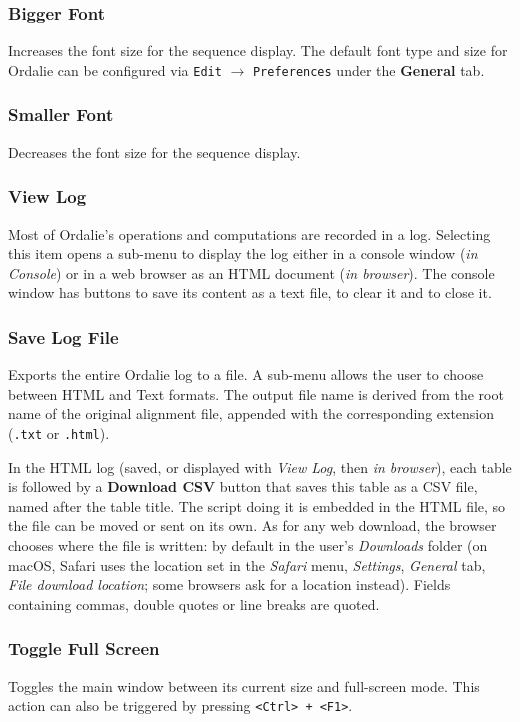 \documentclass[a4paper]{article}
\begin{document}
\subsubsection{Bigger Font}
Increases the font size for the sequence display. The default font type and size for Ordalie can be configured via \texttt{Edit} $\rightarrow$ \texttt{Preferences} under the \textbf{General} tab.

\subsubsection{Smaller Font}
Decreases the font size for the sequence display.

\subsubsection{View Log}
\label{viewlog}
Most of Ordalie's operations and computations are recorded in a log. Selecting this item opens a sub-menu to display the log either in a console window (\textit{in Console}) or in a web browser as an HTML document (\textit{in browser}). The console window has buttons to save its content as a text file, to clear it and to close it.

\subsubsection{Save Log File}
Exports the entire Ordalie log to a file. A sub-menu allows the user to choose between HTML and Text formats. The output file name is derived from the root name of the original alignment file, appended with the corresponding extension (\texttt{.txt} or \texttt{.html}).

In the HTML log (saved, or displayed with \textit{View Log}, then \textit{in browser}), each table is followed by a \textbf{Download CSV} button that saves this table as a CSV file, named after the table title. The script doing it is embedded in the HTML file, so the file can be moved or sent on its own. As for any web download, the browser chooses where the file is written: by default in the user's \textit{Downloads} folder (on macOS, Safari uses the location set in the \textit{Safari} menu, \textit{Settings}, \textit{General} tab, \textit{File download location}; some browsers ask for a location instead). Fields containing commas, double quotes or line breaks are quoted.

\subsubsection{Toggle Full Screen}
Toggles the main window between its current size and full-screen mode. This action can also be triggered by pressing \texttt{<Ctrl> + <F1>}.
\end{document}
